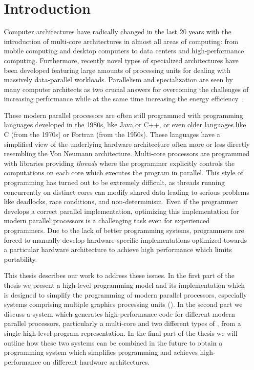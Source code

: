 
\chapter{Introduction} %

\label{ch:introduction} %

Computer architectures have radically changed in the last 20 years with the introduction of multi-core architectures in almost all areas of computing:
from mobile computing and desktop computers to data centers and high-performance computing.
Furthermore, recently novel types of specialized architectures have been developed featuring large amounts of processing units for dealing with massively data-parallel workloads.
Parallelism and specialization are seen by many computer architects as two crucial answers for overcoming the challenges of increasing performance while at the same time increasing the energy efficiency~\cite{}.

These modern parallel processors are often still programmed with programming languages developed in the 1980s, like Java or C++, or even older languages like C (from the 1970s) or Fortran (from the 1950s).
These languages have a simplified view of the underlying hardware architecture often more or less directly resembling the Von Neumann architecture.
Multi-core processors are programmed with libraries providing \emph{threads} where the programmer explicitly controls the computations on each core which executes the program in parallel.
This style of programming has turned out to be extremely difficult, as threads running concurrently on distinct cores can modify shared data leading to serious problems like deadlocks, race conditions, and non-determinism.
Even if the programmer develops a correct parallel implementation, optimizing this implementation for modern parallel processors is a challenging task even for experienced programmers.
Due to the lack of better programming systems, programmers are forced to manually develop hardware-specific implementations optimized towards a particular hardware architecture to achieve high performance which limits portability.

This thesis describes our work to address these issues.
In the first part of the thesis we present a high-level programming model and its implementation which is designed to simplify the programming of modern parallel processors, especially systems comprising multiple graphics processing units (\GPUs).
In the second part we discuss a system which generates high-performance code for different modern parallel processors, particularly a multi-core \CPU and two different types of \GPUs, from a single high-level program representation.
In the final part of the thesis we will outline how these two systems can be combined in the future to obtain a programming system which simplifies programming and achieves high-performance on different hardware architectures.

